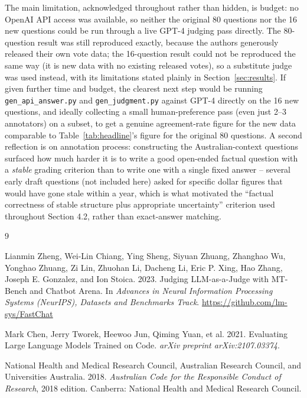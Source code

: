 \documentclass[11pt,twocolumn]{article}
\begin{document}
The main limitation, acknowledged throughout rather than hidden, is budget: no OpenAI API access
was available, so neither the original 80 questions nor the 16 new questions could be run through a
live GPT-4 judging pass directly. The 80-question result was still reproduced exactly, because the
authors generously released their own vote data; the 16-question result could not be reproduced the
same way (it is new data with no existing released votes), so a substitute judge was used instead,
with its limitations stated plainly in Section~\ref{sec:results}. If given further time and budget,
the clearest next step would be running \texttt{gen\_api\_answer.py} and \texttt{gen\_judgment.py}
against GPT-4 directly on the 16 new questions, and ideally collecting a small human-preference
pass (even just 2--3 annotators) on a subset, to get a genuine agreement-rate figure for the new
data comparable to Table~\ref{tab:headline}'s figure for the original 80 questions. A second
reflection is on annotation process: constructing the Australian-context questions surfaced how much
harder it is to write a good open-ended factual question with a \emph{stable} grading criterion than
to write one with a single fixed answer -- several early draft questions (not included here) asked
for specific dollar figures that would have gone stale within a year, which is what motivated the
``factual correctness of stable structure plus appropriate uncertainty'' criterion used throughout
Section 4.2, rather than exact-answer matching.


\begin{thebibliography}{9}

Lianmin Zheng, Wei-Lin Chiang, Ying Sheng, Siyuan Zhuang, Zhanghao Wu, Yonghao Zhuang, Zi Lin,
Zhuohan Li, Dacheng Li, Eric P. Xing, Hao Zhang, Joseph E. Gonzalez, and Ion Stoica. 2023.
Judging LLM-as-a-Judge with MT-Bench and Chatbot Arena. In \emph{Advances in Neural Information
Processing Systems (NeurIPS), Datasets and Benchmarks Track}.
\url{https://github.com/lm-sys/FastChat}

Mark Chen, Jerry Tworek, Heewoo Jun, Qiming Yuan, et al. 2021. Evaluating Large Language Models
Trained on Code. \emph{arXiv preprint arXiv:2107.03374}.

National Health and Medical Research Council, Australian Research Council, and Universities
Australia. 2018. \emph{Australian Code for the Responsible Conduct of Research}, 2018 edition.
Canberra: National Health and Medical Research Council.

\end{thebibliography}
\end{document}
